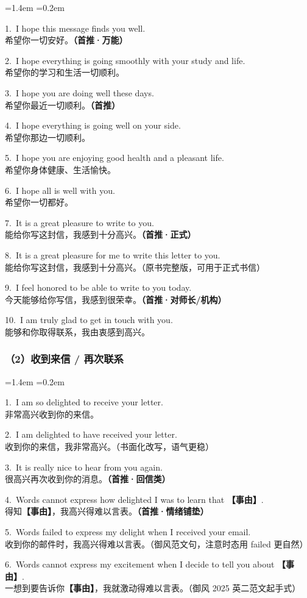 \documentclass[11pt,a4paper]{ctexart}
\newcommand{\fillin}[1]{{\bfseries【#1】}}
\newcommand{\kw}[1]{{\bfseries\color{accent}#1}}
\newenvironment{eg}{%
  \par\addvspace{4pt}%
  \begin{list}{}{\leftmargin=1.4em \rightmargin=0.2em \listparindent=0pt
    \itemindent=0pt \topsep=0pt \parsep=2pt \itemsep=2pt \partopsep=0pt}%
  \item\relax
}{%
  \end{list}\addvspace{5pt}%
}
\begin{document}
\begin{eg}
1.\ I hope this message finds you well.\\
希望你一切安好。\kw{（首推·万能）}

2.\ I hope everything is going smoothly with your study and life.\\
希望你的学习和生活一切顺利。

3.\ I hope you are doing well these days.\\
希望你最近一切顺利。\kw{（首推）}

4.\ I hope everything is going well on your side.\\
希望你那边一切顺利。

5.\ I hope you are enjoying good health and a pleasant life.\\
希望你身体健康、生活愉快。

6.\ I hope all is well with you.\\
希望你一切都好。

7.\ It is a great pleasure to write to you.\\
能给你写这封信，我感到十分高兴。\kw{（首推·正式）}

8.\ It is a great pleasure for me to write this letter to you.\\
能给你写这封信，我感到十分高兴。（原书完整版，可用于正式书信）

9.\ I feel honored to be able to write to you today.\\
今天能够给你写信，我感到很荣幸。\kw{（首推·对师长/机构）}

10.\ I am truly glad to get in touch with you.\\
能够和你取得联系，我由衷感到高兴。
\end{eg}

\subsubsection{（2）收到来信 / 再次联系}

\begin{eg}
1.\ I am so delighted to receive your letter.\\
非常高兴收到你的来信。

2.\ I am delighted to have received your letter.\\
收到你的来信，我非常高兴。（书面化改写，语气更稳）

3.\ It is really nice to hear from you again.\\
很高兴再次收到你的消息。\kw{（首推·回信类）}

4.\ Words cannot express how delighted I was to learn that \fillin{事由}.\\
得知\fillin{事由}，我高兴得难以言表。\kw{（首推·情绪铺垫）}

5.\ Words failed to express my delight when I received your email.\\
收到你的邮件时，我高兴得难以言表。（御风范文句，注意时态用 failed 更自然）

6.\ Words cannot express my excitement when I decide to tell you about \fillin{事由}.\\
一想到要告诉你\fillin{事由}，我就激动得难以言表。（御风 2025 英二范文起手式）
\end{eg}
\end{document}
